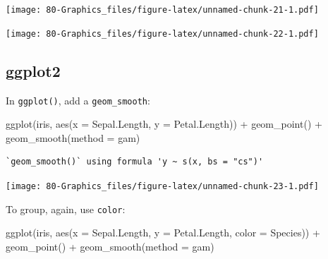 \documentclass[
]{book}
\newenvironment{Shaded}{\begin{snugshade}}{\end{snugshade}}
\newcommand{\AttributeTok}[1]{\textcolor[rgb]{0.77,0.63,0.00}{#1}}
\newcommand{\FunctionTok}[1]{\textcolor[rgb]{0.00,0.00,0.00}{#1}}
\newcommand{\NormalTok}[1]{#1}
\newcommand{\SpecialCharTok}[1]{\textcolor[rgb]{0.00,0.00,0.00}{#1}}
\newcommand{\StringTok}[1]{\textcolor[rgb]{0.31,0.60,0.02}{#1}}
\begin{document}
\texttt{[image: 80-Graphics\_files/figure-latex/unnamed-chunk-21-1.pdf]}

\begin{Shaded}
\end{Shaded}

\texttt{[image: 80-Graphics\_files/figure-latex/unnamed-chunk-22-1.pdf]}

\hypertarget{ggplot2-2}{%
\subsection{\texorpdfstring{\textbf{ggplot2}}{ggplot2}}\label{ggplot2-2}}

In \texttt{ggplot()}, add a \texttt{geom\_smooth}:

\begin{Shaded}
\begin{Highlighting}[]
\FunctionTok{ggplot}\NormalTok{(iris, }\FunctionTok{aes}\NormalTok{(}\AttributeTok{x =}\NormalTok{ Sepal.Length, }\AttributeTok{y =}\NormalTok{ Petal.Length)) }\SpecialCharTok{+}
  \FunctionTok{geom\_point}\NormalTok{() }\SpecialCharTok{+}
  \FunctionTok{geom\_smooth}\NormalTok{(}\AttributeTok{method =} \StringTok{\textquotesingle{}gam\textquotesingle{}}\NormalTok{)}
\end{Highlighting}
\end{Shaded}

\begin{verbatim}
`geom_smooth()` using formula 'y ~ s(x, bs = "cs")'
\end{verbatim}

\texttt{[image: 80-Graphics\_files/figure-latex/unnamed-chunk-23-1.pdf]}

To group, again, use \texttt{color}:

\begin{Shaded}
\begin{Highlighting}[]
\FunctionTok{ggplot}\NormalTok{(iris, }\FunctionTok{aes}\NormalTok{(}\AttributeTok{x =}\NormalTok{ Sepal.Length, }\AttributeTok{y =}\NormalTok{ Petal.Length, }\AttributeTok{color =}\NormalTok{ Species)) }\SpecialCharTok{+}
  \FunctionTok{geom\_point}\NormalTok{() }\SpecialCharTok{+}
  \FunctionTok{geom\_smooth}\NormalTok{(}\AttributeTok{method =} \StringTok{\textquotesingle{}gam\textquotesingle{}}\NormalTok{)}
\end{Highlighting}
\end{Shaded}
\end{document}
